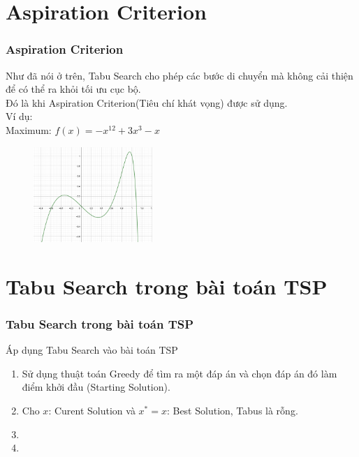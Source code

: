 \documentclass[12pt]{beamer}
\begin{document}
	\section{Aspiration Criterion}
	\begin{frame}
		\frametitle{Aspiration Criterion}
		Như đã nói ở trên, Tabu Search cho phép các bước di chuyển mà không cải thiện để có thể ra khỏi tối ưu cục bộ.\\
		Đó là khi Aspiration Criterion(Tiêu chí khát vọng) được sử dụng.\\
		Ví dụ:\\
		Maximum: $f(x) = -x^{12} + 3x^3 - x$
		\begin{figure}
			\includegraphics[width=4.5cm]{AC.png}
		\end{figure}
		
	\end{frame}
	
	\section{Tabu Search trong bài toán TSP}
	\begin{frame}
		\frametitle{Tabu Search trong bài toán TSP}
		
		Áp dụng Tabu Search vào bài toán TSP\\
		\begin{enumerate}[Bước 1:]
			\item Sử dụng thuật toán Greedy để tìm ra một đáp án và chọn đáp án đó làm điểm khởi đầu (Starting Solution).
			\item Cho $x$: Curent Solution và $x^* = x$: Best Solution, Tabus là rỗng.
			\item
			\item
		\end{enumerate}
	\end{frame}
\end{document}
